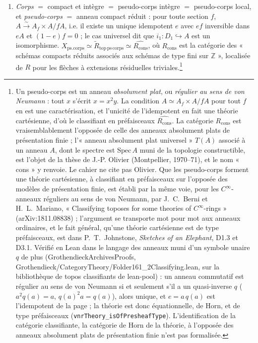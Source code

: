\documentclass[11pt,a4paper]{article}
\begin{document}
\begin{enumerate}
\item[12)--13)] \emph{Corps} $=$ compact et intègre $=$ pseudo-corps intègre
$=$ pseudo-corps local, et \emph{pseudo-corps} $=$ anneau compact réduit :
pour toute section $f$, $A \xrightarrow{\sim} A_{f} \times A/fA$, i.e. il
existe un unique idempotent $e$ avec $ef$ inversible dans $eA$ et $(1-e)f =
0$ ; le cas universel dit que $i_{1} : D_{1} \hookrightarrow A$ est un
isomorphisme. $X_{\mathrm{ps.corps}} \simeq \widetilde{R}_{\mathrm{top\,ps\,
corps}} \simeq \widehat{R_{\mathrm{cons}}}$, où $R_{\mathrm{cons}}$ est la
catégorie des « schémas compacts réduits associés aux schémas de type fini
sur $\mathbb{Z}$ », localisée de $R$ pour les flèches à extensions
résiduelles triviales.\footnote{Un pseudo-corps est un anneau
\emph{absolument plat}, ou \emph{régulier au sens de von Neumann} : tout
$x$ s'écrit $x = x^{2}y$. La condition $A \simeq A_{f} \times A/fA$ pour
tout $f$ en est une caractérisation, et l'unicité de l'idempotent en fait
une théorie cartésienne, d'où le classifiant en préfaisceaux
$\widehat{R_{\mathrm{cons}}}$. La catégorie $R_{\mathrm{cons}}$ est
vraisemblablement l'opposée de celle des anneaux absolument plats de
présentation finie ; l'« anneau absolument plat universel » $T(A)$
associé à un anneau $A$, dont le spectre est $\mathrm{Spec}\,A$ muni de la
topologie constructible, est l'objet de la thèse de J.-P. Olivier
(Montpellier, 1970--71), et le nom « cons » y renvoie. Le cahier ne cite
pas Olivier. Que les pseudo-corps forment une théorie cartésienne, à
classifiant en préfaisceaux sur l'opposée des modèles de présentation finie,
est établi par la même voie, pour les $C^{\infty}$-anneaux réguliers au sens
de von Neumann, par J.~C.~Berni et H.~L.~Mariano, « Classifying toposes for
some theories of $C^{\infty}$-rings » (arXiv:1811.08838) ; l'argument se
transporte mot pour mot aux anneaux ordinaires, et le fait général, qu'une
théorie cartésienne est de type préfaisceaux, est dans P.~T.~Johnstone,
\emph{Sketches of an Elephant}, D1.3 et D3.1. Vérifié en Lean dans le langage des
anneaux muni d'un symbole unaire $q$ de plus (GrothendieckArchivesProofs,
Grothendieck/CategoryTheory/Folder161\_2Classifying.lean, sur la bibliothèque de topos
classifiants de lean-pool) : un anneau commutatif est régulier au sens de von
Neumann si et seulement s'il a un quasi-inverse $q$ ($a^{2}q(a) = a$,
$q(a)^{2}a = q(a)$), alors unique, et $e = a\,q(a)$ est l'idempotent de la page ;
la théorie est donc équationnelle, de Horn, et de type préfaisceaux
(\texttt{vnrTheory\_isOfPresheafType}). L'identification de la catégorie
classifiante, la catégorie de Horn de la théorie, à
l'opposée des anneaux absolument plats de présentation finie n'est pas
formalisée.}


\end{enumerate}
\end{document}
